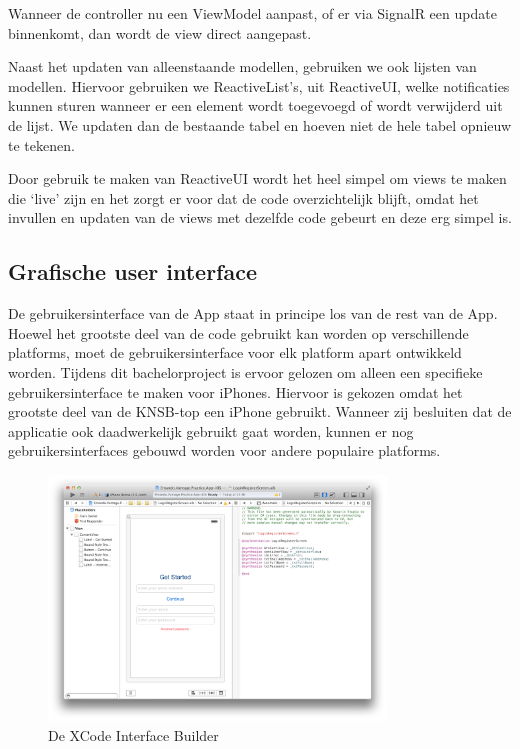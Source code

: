
Wanneer de controller nu een ViewModel aanpast, of er via SignalR een update binnenkomt, dan wordt de view direct aangepast. 

Naast het updaten van alleenstaande modellen, gebruiken we ook lijsten van modellen. Hiervoor gebruiken we ReactiveList's, uit ReactiveUI, welke notificaties kunnen sturen wanneer er een element wordt toegevoegd of wordt verwijderd uit de lijst. We updaten dan de bestaande tabel en hoeven niet de hele tabel opnieuw te tekenen.

Door gebruik te maken van ReactiveUI wordt het heel simpel om views te maken die `live' zijn en het zorgt er voor dat de code overzichtelijk blijft, omdat het invullen en updaten van de views met dezelfde code gebeurt en deze erg simpel is.

\subsection{Grafische user interface}

De gebruikersinterface van de App staat in principe los van de rest van de App. Hoewel het grootste deel van de code gebruikt kan worden op verschillende platforms, moet de gebruikersinterface voor elk platform apart ontwikkeld worden. Tijdens dit bachelorproject is ervoor gelozen om alleen een specifieke gebruikersinterface te maken voor iPhones. Hiervoor is gekozen omdat het grootste deel van de KNSB-top een iPhone gebruikt. Wanneer zij besluiten dat de applicatie ook daadwerkelijk gebruikt gaat worden, kunnen er nog gebruikersinterfaces gebouwd worden voor andere populaire platforms.

\begin{figure}[h!t]
\centering
\includegraphics[width=0.8\textwidth]{style/images/screenshots/InterfaceBuilder}
\caption{De XCode Interface Builder}
\label{fig:interface-builder}
\end{figure}

